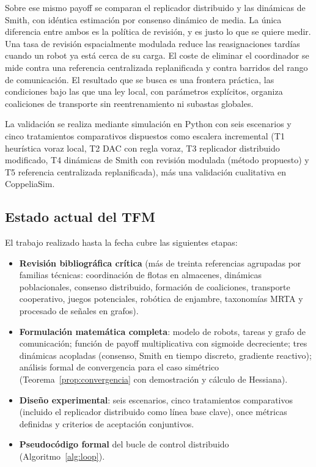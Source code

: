 Sobre ese mismo payoff se comparan el replicador distribuido y las dinámicas de
Smith, con idéntica estimación por consenso dinámico de media. La única diferencia entre
ambos es la política de revisión, y es justo lo que se quiere medir. Una tasa de revisión
espacialmente modulada reduce las reasignaciones tardías cuando un robot ya está cerca de
su carga. El coste de eliminar el coordinador se mide contra una referencia centralizada
replanificada y contra barridos del rango de comunicación. El resultado que se busca es
una frontera práctica, las condiciones bajo las que una ley local, con parámetros explícitos,
organiza coaliciones de transporte sin reentrenamiento ni subastas globales.

La validación se realiza mediante simulación en Python con seis
escenarios y cinco tratamientos comparativos dispuestos como escalera incremental
(T1 heurística voraz local, T2 DAC con regla voraz, T3 replicador distribuido
modificado, T4 dinámicas de Smith con revisión modulada (método propuesto) y
T5 referencia centralizada replanificada), más una validación cualitativa en CoppeliaSim.

\subsection{Estado actual del TFM}
\label{subsec:estado}

El trabajo realizado hasta la fecha cubre las siguientes etapas:

\begin{itemize}
  \item \textbf{Revisión bibliográfica crítica} (más de treinta referencias agrupadas
    por familias técnicas:
    coordinación de flotas en almacenes, dinámicas poblacionales, consenso
    distribuido, formación de coaliciones, transporte cooperativo, juegos
    potenciales, robótica de enjambre, taxonomías MRTA y procesado de señales en grafos).
  \item \textbf{Formulación matemática completa}: modelo de robots, tareas y
    grafo de comunicación; función de payoff multiplicativa con sigmoide
    decreciente; tres dinámicas acopladas (consenso, Smith en tiempo discreto,
    gradiente reactivo); análisis formal de convergencia para el caso simétrico
    (Teorema~\ref{prop:convergencia} con demostración y cálculo de Hessiana).
  \item \textbf{Diseño experimental}: seis escenarios, cinco tratamientos
    comparativos (incluido el replicador distribuido como línea base clave),
    once métricas definidas y criterios de aceptación conjuntivos.
  \item \textbf{Pseudocódigo formal} del bucle de control distribuido
    (Algoritmo~\ref{alg:loop}).
\end{itemize}

